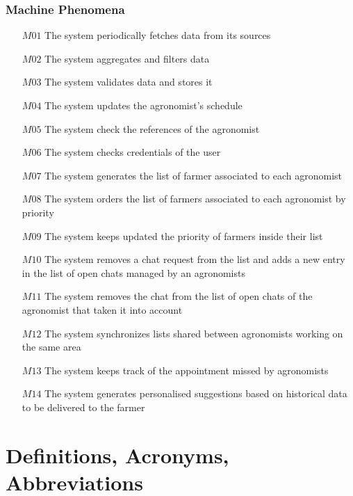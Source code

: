 \documentclass[10pt]{report}
\begin{document}
            \subsubsection{Machine Phenomena}
                \begin{itemize}%
                    \item [$M01$] The system periodically fetches data from its sources
                    \item [$M02$] The system aggregates and filters data
                    \item [$M03$] The system validates data and stores it
                    \item [$M04$] The system updates the agronomist’s schedule
                    \item [$M05$] The system check the references of the agronomist
                    \item [$M06$] The system checks credentials of the user
                    \item [$M07$] The system generates the list of farmer associated to each agronomist
                    \item [$M08$] The system orders the list of farmers associated to each agronomist by priority
                    \item [$M09$] The system keeps updated the priority of farmers inside their list
                    \item [$M10$] The system removes a chat request from the list and adds a new entry in the list of open chats managed by an agronomists
                    \item [$M11$] The system removes the chat from the list of open chats of the agronomist that taken it into account
                    \item [$M12$] The system synchronizes lists shared between agronomists working on the same area
                    \item [$M13$] The system keeps track of the appointment missed by agronomists
                    \item [$M14$] The system generates personalised suggestions based on historical data to be delivered to the farmer
                \end{itemize}
    \section{Definitions, Acronyms, Abbreviations}
\end{document}
